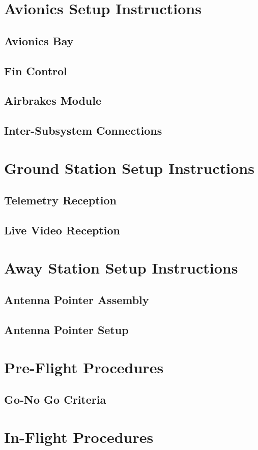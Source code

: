 \documentclass{amsdtx}
\begin{document}
\newpage\section{Avionics Setup Instructions}
\subsection{Avionics Bay}
\subsection{Fin Control}
\subsection{Airbrakes Module}
\subsection{Inter-Subsystem Connections}
\newpage\section{Ground Station Setup Instructions}
\subsection{Telemetry Reception}
\subsection{Live Video Reception}
\newpage\section{Away Station Setup Instructions}
\subsection{Antenna Pointer Assembly}
\subsection{Antenna Pointer Setup}
\newpage\section{Pre-Flight Procedures}
\subsection{Go-No Go Criteria}
\newpage\section{In-Flight Procedures}
\end{document}
